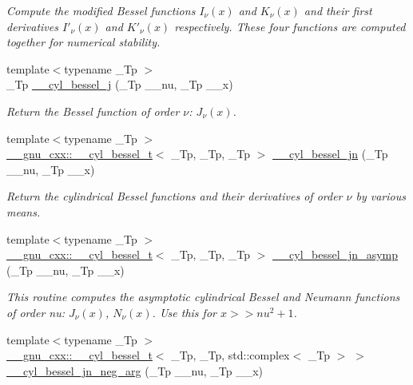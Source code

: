 \begin{DoxyCompactItemize}
\begin{DoxyCompactList}\small\item\em Compute the modified Bessel functions $ I_\nu(x) $ and $ K_\nu(x) $ and their first derivatives $ I'_\nu(x) $ and $ K'_\nu(x) $ respectively. These four functions are computed together for numerical stability. \end{DoxyCompactList}\item 
{\footnotesize template$<$typename \+\_\+\+Tp $>$ }\\\+\_\+\+Tp \hyperlink{namespacestd_1_1____detail_a9909fc0c463a7f0b9259fe02e15fce55}{\+\_\+\+\_\+cyl\+\_\+bessel\+\_\+j} (\+\_\+\+Tp \+\_\+\+\_\+nu, \+\_\+\+Tp \+\_\+\+\_\+x)
\begin{DoxyCompactList}\small\item\em Return the Bessel function of order $ \nu $\+: $ J_{\nu}(x) $. \end{DoxyCompactList}\item 
{\footnotesize template$<$typename \+\_\+\+Tp $>$ }\\\hyperlink{struct____gnu__cxx_1_1____cyl__bessel__t}{\+\_\+\+\_\+gnu\+\_\+cxx\+::\+\_\+\+\_\+cyl\+\_\+bessel\+\_\+t}$<$ \+\_\+\+Tp, \+\_\+\+Tp, \+\_\+\+Tp $>$ \hyperlink{namespacestd_1_1____detail_ae70ea3200a43241a3c6a73d3aa2dc1cc}{\+\_\+\+\_\+cyl\+\_\+bessel\+\_\+jn} (\+\_\+\+Tp \+\_\+\+\_\+nu, \+\_\+\+Tp \+\_\+\+\_\+x)
\begin{DoxyCompactList}\small\item\em Return the cylindrical Bessel functions and their derivatives of order $ \nu $ by various means. \end{DoxyCompactList}\item 
{\footnotesize template$<$typename \+\_\+\+Tp $>$ }\\\hyperlink{struct____gnu__cxx_1_1____cyl__bessel__t}{\+\_\+\+\_\+gnu\+\_\+cxx\+::\+\_\+\+\_\+cyl\+\_\+bessel\+\_\+t}$<$ \+\_\+\+Tp, \+\_\+\+Tp, \+\_\+\+Tp $>$ \hyperlink{namespacestd_1_1____detail_aeab3c6b4c96d8885871d2973b77e537f}{\+\_\+\+\_\+cyl\+\_\+bessel\+\_\+jn\+\_\+asymp} (\+\_\+\+Tp \+\_\+\+\_\+nu, \+\_\+\+Tp \+\_\+\+\_\+x)
\begin{DoxyCompactList}\small\item\em This routine computes the asymptotic cylindrical Bessel and Neumann functions of order nu\+: $ J_{\nu}(x) $, $ N_{\nu}(x) $. Use this for $ x >> nu^2 + 1 $. \end{DoxyCompactList}\item 
{\footnotesize template$<$typename \+\_\+\+Tp $>$ }\\\hyperlink{struct____gnu__cxx_1_1____cyl__bessel__t}{\+\_\+\+\_\+gnu\+\_\+cxx\+::\+\_\+\+\_\+cyl\+\_\+bessel\+\_\+t}$<$ \+\_\+\+Tp, \+\_\+\+Tp, std\+::complex$<$ \+\_\+\+Tp $>$ $>$ \hyperlink{namespacestd_1_1____detail_a82d890270a5a8697d4af64c390b4b0e4}{\+\_\+\+\_\+cyl\+\_\+bessel\+\_\+jn\+\_\+neg\+\_\+arg} (\+\_\+\+Tp \+\_\+\+\_\+nu, \+\_\+\+Tp \+\_\+\+\_\+x)

\end{DoxyCompactItemize}
